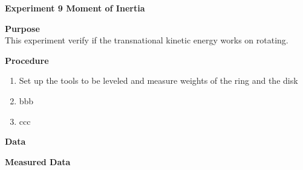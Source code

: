 \documentclass[12pt,letterpaper,fleqn]{article}
\begin{document}
\hfill
{}\hfill
\begin{center}
{\LARGE\bf Experiment 9\linebreak  
            Moment of Inertia}
\end{center}



\begin{flushleft}
{\LARGE\bf Purpose}\\
{\hspace{3pt}This experiment verify if the transnational kinetic energy works on rotating.  }
\end{flushleft}

\begin{flushleft}
{\LARGE\bf Procedure}
\begin{enumerate}
\item Set up the tools to be leveled and measure weights of the ring and the disk
\item bbb
\item ccc
\end{enumerate}
\end{flushleft}



\begin{flushleft}
{\LARGE\bf Data}
\end{flushleft}

\begin{center}
{\large\bf Measured Data}
\end{center}
\end{document}
